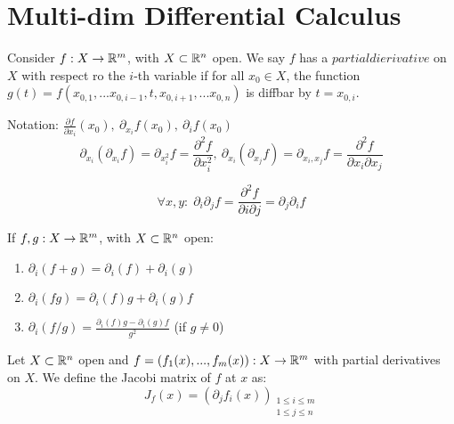 \chapter{Multi-dim Differential Calculus}

\begin{definition}
	Consider $f: X \to \mathbb{R}^m$, with $X \subset \mathbb{R}^n$ open.
	We say $f$ has a $partial dierivative$ on $X$ with respect ro the $i$-th variable if for all $x_0 \in X$, the function $g(t) = f(x_{0,1},...x_{0,i-1},t,x_{0,i+1},...x_{0,n})$ is diffbar by $t = x_{0,i}$.
	
	Notation: $\frac{\partial f}{\partial x_i}(x_0), \ \partial_{x_i}f(x_0), \ \partial_if(x_0)$
	$$\partial_{x_i}(\partial_{x_i} f) = \partial_{x_i^2}f = \frac{\partial^2 f}{\partial x_i^2}, \ \partial_{x_i}(\partial_{x_j} f) = \partial_{x_i, x_j}f = \frac{\partial^2 f}{\partial x_i \partial x_j}$$
\end{definition}

\begin{theorem}
	$$\forall x,y:\; \partial_i \partial_j f = \frac{\partial^2 f}{\partial i \partial j} = \partial_j \partial_i f$$
\end{theorem}

\begin{proposition}
	If $f,g: X \to \mathbb{R}^m$, with $X \subset \mathbb{R}^n$ open:
	\begin{enumerate}
		\item $\partial_i(f+g) = \partial_i(f) + \partial_i(g)$
		\item $\partial_i(fg) = \partial_i(f)g + \partial_i(g)f$
		\item $\partial_i(f/g) = \frac{\partial_i(f)g - \partial_i(g)f}{g^2}$ (if $g \neq 0$)
	\end{enumerate}
\end{proposition}

\begin{definition}
	Let $X \subset \mathbb{R}^n$ open and $f=(f_1(x), ..., f_m(x)): X \to \mathbb{R}^m$ with partial derivatives on $X$.
	We define the Jacobi matrix of $f$ at $x$ as:
	$$J_f(x) = (\partial_j f_i(x))_{\substack{1 \leq i \leq m \\ 1 \leq j \leq n}}$$
\end{definition}

